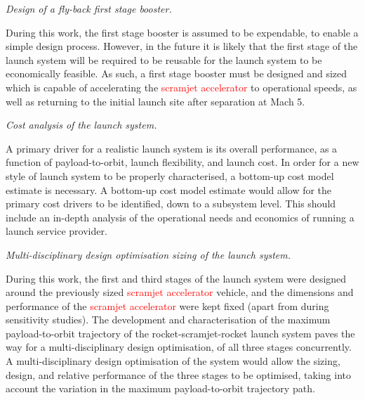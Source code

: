 \vspace{10pt}
 \textit{Design of a fly-back first stage booster.}
 
 \noindent
 During this work, the first stage booster is assumed to be expendable, to enable a simple design process. However, in the future it is likely that the first stage of the launch system will be required to be reusable for the launch system to be economically feasible. As such, a first stage booster must be designed and sized which is capable of accelerating the \textcolor{red}{scramjet accelerator} to operational speeds, as well as returning to the initial launch site after separation at Mach 5. 

\vspace{10pt}
 \textit{Cost analysis of the launch system.}

 \noindent
A primary driver for a realistic launch system is its overall performance, as a function of payload-to-orbit, launch flexibility, and launch cost. In order for a new style of launch system to be properly characterised, a bottom-up cost model estimate is necessary. A bottom-up cost model estimate would allow for the primary cost drivers to be identified, down to a subsystem level. This should include an in-depth analysis of the operational needs and economics of running a launch service provider.

\vspace{10pt}
 \textit{Multi-disciplinary design optimisation sizing of the launch system.}

 \noindent
During this work, the first and third stages of the launch system were designed around the previously sized \textcolor{red}{scramjet accelerator} vehicle, and the dimensions and performance of the \textcolor{red}{scramjet accelerator} were kept fixed (apart from during sensitivity studies).
The development and characterisation of the maximum payload-to-orbit trajectory of the rocket-scramjet-rocket launch system paves the way for a multi-disciplinary design optimisation, of all three stages concurrently. A multi-disciplinary design optimisation of the system would allow the sizing, design, and relative performance of the three stages to be optimised, taking into account the variation in the maximum payload-to-orbit trajectory path.  


